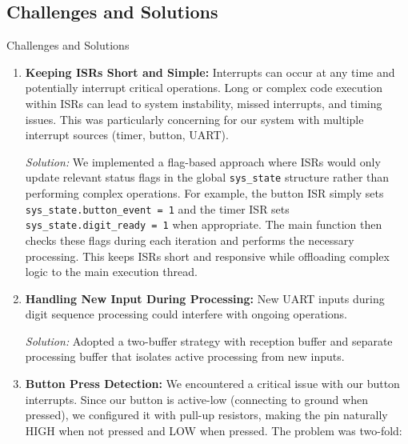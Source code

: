 \documentclass[12pt,a4paper]{article}
\begin{document}
\subsection{Challenges and Solutions}

\begin{mytitledbox}{Challenges and Solutions}
\begin{enumerate}[label=\textcolor{myblue}{\textbf{\arabic*.}}, itemsep=1.5mm]    

    \item \textbf{Keeping ISRs Short and Simple:} 
    Interrupts can occur at any time and potentially interrupt critical operations. Long or complex code execution within ISRs can lead to system instability, missed interrupts, and timing issues. This was particularly concerning for our system with multiple interrupt sources (timer, button, UART).
    
    \begin{solutionbox}
    \textit{Solution:} We implemented a flag-based approach where ISRs would only update relevant status flags in the global \texttt{sys\_state} structure rather than performing complex operations. For example, the button ISR simply sets \texttt{sys\_state.button\_event = 1} and the timer ISR sets \texttt{sys\_state.digit\_ready = 1} when appropriate. The main function then checks these flags during each iteration and performs the necessary processing. This keeps ISRs short and responsive while offloading complex logic to the main execution thread.
    \end{solutionbox}

    \item \textbf{Handling New Input During Processing:} 
    New UART inputs during digit sequence processing could interfere with ongoing operations.
    
    \begin{solutionbox}
    \textit{Solution:} Adopted a two-buffer strategy with reception buffer and separate processing buffer that isolates active processing from new inputs.
    \end{solutionbox}

\item \textbf{Button Press Detection:} We encountered a critical issue with our button interrupts. Since our button is active-low (connecting to ground when pressed), we configured it with pull-up resistors, making the pin naturally HIGH when not pressed and LOW when pressed. The problem was two-fold:


\end{enumerate}
\end{mytitledbox}
\end{document}

